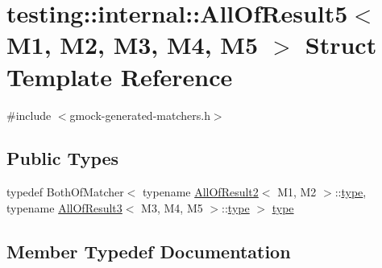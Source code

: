 \hypertarget{structtesting_1_1internal_1_1_all_of_result5}{}\section{testing\+::internal\+::All\+Of\+Result5$<$ M1, M2, M3, M4, M5 $>$ Struct Template Reference}
\label{structtesting_1_1internal_1_1_all_of_result5}


{\ttfamily \#include $<$gmock-\/generated-\/matchers.\+h$>$}

\subsection*{Public Types}
\begin{DoxyCompactItemize}
\item 
typedef Both\+Of\+Matcher$<$ typename \mbox{\hyperlink{structtesting_1_1internal_1_1_all_of_result2}{All\+Of\+Result2}}$<$ M1, M2 $>$\+::\mbox{\hyperlink{structtesting_1_1internal_1_1_all_of_result5_aee2e1fb803f428741d147347b692d108}{type}}, typename \mbox{\hyperlink{structtesting_1_1internal_1_1_all_of_result3}{All\+Of\+Result3}}$<$ M3, M4, M5 $>$\+::\mbox{\hyperlink{structtesting_1_1internal_1_1_all_of_result5_aee2e1fb803f428741d147347b692d108}{type}} $>$ \mbox{\hyperlink{structtesting_1_1internal_1_1_all_of_result5_aee2e1fb803f428741d147347b692d108}{type}}
\end{DoxyCompactItemize}


\subsection{Member Typedef Documentation}
\mbox{\label{structtesting_1_1internal_1_1_all_of_result5_aee2e1fb803f428741d147347b692d108}} 
